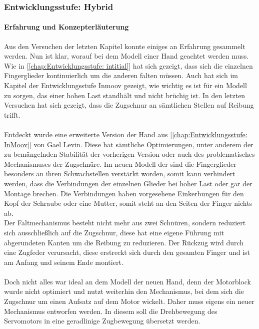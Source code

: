 \documentclass[titlepage,12pt,twoside]{article}
\begin{document}
\subsubsection{Entwicklungsstufe: Hybrid} 
\label{chap:Entwicklungsstufe: Hybrid}
\paragraph{Erfahrung und Konzepterläuterung}
\hfill \break
\hfill \break
Aus den Versuchen der letzten Kapitel konnte einiges an Erfahrung gesammelt werden. Nun ist klar, worauf bei dem Modell einer Hand geachtet werden muss. \\
Wie in [\textcolor{blue}{\autoref{chap:Entwicklungsstufe: intitial}}] hat sich gezeigt, dass sich die einzelnen Fingerglieder kontinuierlich um die anderen falten müssen. Auch hat sich im Kapitel der Entwicklungsstufe Inmoov gezeigt, wie wichtig es ist für ein Modell zu sorgen, das einer hohen 
Last standhält und nicht brüchig ist. In den letzten Versuchen hat sich gezeigt, dass die Zugschnur an sämtlichen Stellen auf Reibung trifft. \\
\\
Entdeckt wurde eine erweiterte Version der Hand aus [\textcolor{blue}{\autoref{chap:Entwicklungsstufe: InMoov}}] von Gael Levin. Diese hat sämtliche Optimierungen, unter anderem der zu bemängelnden Stabilität der vorherigen Version oder auch des problematisches Mechanismuses der 
Zugschnüre. Im neuen Modell der  sind die Fingerglieder besonders an ihren Schwachstellen verstärkt worden, somit kann verhindert werden, dass die Verbindungen der einzelnen Glieder bei hoher Last oder gar der Montage brechen. Die 
Verbindungen haben vorgesehene Einkerbungen für den Kopf der Schraube oder eine Mutter, somit steht an den Seiten der Finger nichts ab. \\
Der Faltmechanismus besteht nicht mehr aus zwei Schnüren, sondern reduziert sich ausschließlich auf die Zugschnur, diese hat eine eigene Führung mit abgerundeten Kanten um die Reibung zu reduzieren. Der Rückzug wird durch eine Zugfeder verursacht, 
diese erstreckt sich durch den gesamten Finger und ist am Anfang und seinem Ende montiert. \\
\\
Doch nicht alles war ideal an dem Modell der neuen Hand, denn der Motorblock wurde nicht optimiert und nutzt weiterhin den Mechanismus, bei dem sich die Zugschnur um einen Aufsatz auf dem Motor wickelt. Daher muss eigens ein neuer Mechanismus 
entworfen werden. In diesem soll die Drehbewegung des Servomotors in eine geradlinige Zugbewegung übersetzt werden. \\
\\
\end{document}
